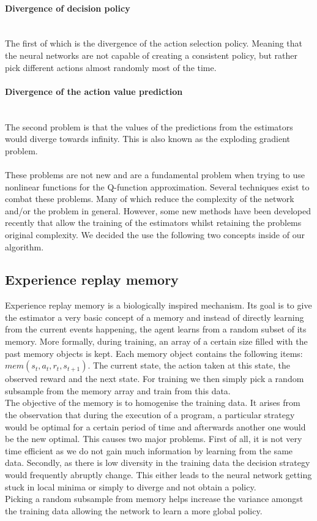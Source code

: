 \paragraph{Divergence of decision policy}\mbox{}\\
The first of which is the divergence of the action selection policy. Meaning that the neural networks are not capable of creating a consistent policy, but rather pick different actions almost randomly most of the time.
\paragraph{Divergence of the action value prediction}\mbox{}\\
The second problem is that the values of the predictions from the estimators would diverge towards infinity. This is also known as the exploding gradient problem.\\
\mbox{}\\
These problems are not new and are a fundamental problem when trying to use nonlinear functions for the Q-function approximation. Several techniques exist to combat these problems. Many of which reduce the complexity of the network and/or the problem in general. However, some new methods have been developed recently that allow the training of the estimators whilst retaining the problems original complexity. We decided the use the following two concepts inside of our algorithm.
\subsection{Experience replay memory}
Experience replay memory \cite{Mnih2015} is a biologically inspired mechanism. Its goal is to give the estimator a very basic concept of a memory and instead of directly learning from the current events happening, the agent learns from a random subset of its memory. More formally, during training, an array of a certain size filled with the past memory objects is kept. Each memory object contains the following items: $mem(s_t, a_t, r_t, s_{t+1})$. The current state, the action taken at this state, the observed reward and the next state. For training we then simply pick a random subsample from the memory array and train from this data.
\\
The objective of the memory is to homogenise the training data. It arises from the observation that during the execution of a program, a particular strategy would be optimal for a certain period of time and afterwards another one would be the new optimal. This causes two major problems. First of all, it is not very time efficient as we do not gain much information by learning from the same data. Secondly, as there is low diversity in the training data the decision strategy would frequently abruptly change. This either leads to the neural network getting stuck in local minima or simply to diverge and not obtain a policy. \\
Picking a random subsample from memory helps increase the variance amongst the training data allowing the network to learn a more global policy. 

